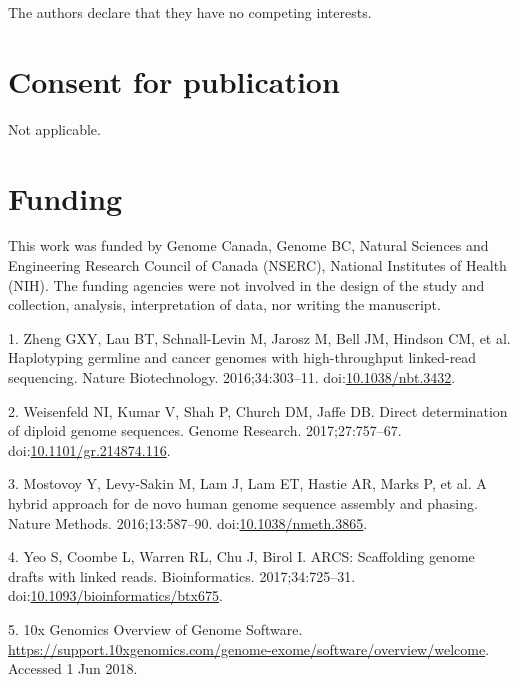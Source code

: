 \documentclass{bmcart}
\begin{document}
\begin{backmatter}
The authors declare that they have no competing interests.

\hypertarget{consent-for-publication}{%
\section*{Consent for publication}\label{consent-for-publication}}

Not applicable.

\hypertarget{funding}{%
\section*{Funding}\label{funding}}

This work was funded by Genome Canada, Genome BC, Natural Sciences and Engineering Research Council of Canada (NSERC), National Institutes of Health (NIH). The funding agencies were not involved in the design of the study and collection, analysis, interpretation of data, nor writing the manuscript.

\begin{thebibliography}{}
\end{thebibliography}

\hypertarget{refs}{}
\leavevmode\hypertarget{ref-Zheng_2016}{}%
1. Zheng GXY, Lau BT, Schnall-Levin M, Jarosz M, Bell JM, Hindson CM, et al. Haplotyping germline and cancer genomes with high-throughput linked-read sequencing. Nature Biotechnology. 2016;34:303--11. doi:\href{https://doi.org/10.1038/nbt.3432}{10.1038/nbt.3432}.

\leavevmode\hypertarget{ref-Weisenfeld_2017}{}%
2. Weisenfeld NI, Kumar V, Shah P, Church DM, Jaffe DB. Direct determination of diploid genome sequences. Genome Research. 2017;27:757--67. doi:\href{https://doi.org/10.1101/gr.214874.116}{10.1101/gr.214874.116}.

\leavevmode\hypertarget{ref-Mostovoy_2016}{}%
3. Mostovoy Y, Levy-Sakin M, Lam J, Lam ET, Hastie AR, Marks P, et al. A hybrid approach for de novo human genome sequence assembly and phasing. Nature Methods. 2016;13:587--90. doi:\href{https://doi.org/10.1038/nmeth.3865}{10.1038/nmeth.3865}.

\leavevmode\hypertarget{ref-Yeo_2017}{}%
4. Yeo S, Coombe L, Warren RL, Chu J, Birol I. ARCS: Scaffolding genome drafts with linked reads. Bioinformatics. 2017;34:725--31. doi:\href{https://doi.org/10.1093/bioinformatics/btx675}{10.1093/bioinformatics/btx675}.

\leavevmode\hypertarget{ref-URL_10x}{}%
5. 10x Genomics Overview of Genome Software. \url{https://support.10xgenomics.com/genome-exome/software/overview/welcome}. Accessed 1 Jun 2018.


\end{backmatter}
\end{document}
